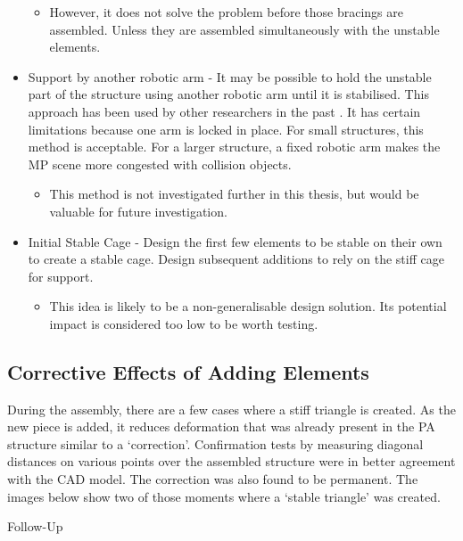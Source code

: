 \begin{itemize}
\begin{itemize}
        \item However, it does not solve the problem before those bracings are assembled. Unless they are assembled simultaneously with the unstable elements.
    \end{itemize}
    \item Support by another robotic arm - It may be possible to hold the unstable part of the structure using another robotic arm until it is stabilised. This approach has been used by other researchers in the past \parencite{adelDesignRoboticallyFabricated2018,helmreichRoboticAssemblyModular2022,paraschoComputationalDesignRobotically2018}. It has certain limitations because one arm is locked in place. For small structures, this method is acceptable. For a larger structure, a fixed robotic arm makes the MP scene more congested with collision objects.
    \begin{itemize}
        \item This method is not investigated further in this thesis, but would be valuable for future investigation.
    \end{itemize}
    \item Initial Stable Cage - Design the first few elements to be stable on their own to create a stable cage. Design subsequent additions to rely on the stiff cage for support.
    \begin{itemize}
        \item This idea is likely to be a non-generalisable design solution. Its potential impact is considered too low to be worth testing.
    \end{itemize}
\end{itemize}

\subsection{Corrective Effects of Adding Elements}
\label{subsection:exploration_2_corrective_effects_of_adding_elements}

During the assembly, there are a few cases where a stiff triangle is created. As the new piece is added, it reduces deformation that was already present in the PA structure similar to a ‘correction’. Confirmation tests by measuring diagonal distances on various points over the assembled structure were in better agreement with the CAD model. The correction was also found to be permanent. The images below show two of those moments where a ‘stable triangle’ was created.

Follow-Up


